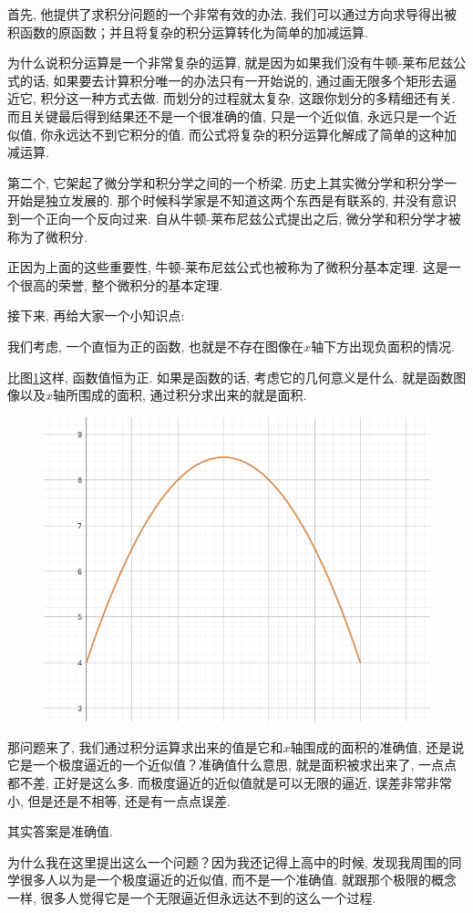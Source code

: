 首先, 他提供了求积分问题的一个非常有效的办法, 我们可以通过方向求导得出被积函数的原函数；并且将复杂的积分运算转化为简单的加减运算. 

为什么说积分运算是一个非常复杂的运算, 就是因为如果我们没有牛顿-莱布尼兹公式的话, 如果要去计算积分唯一的办法只有一开始说的, 通过画无限多个矩形去逼近它, 积分这一种方式去做. 而划分的过程就太复杂, 这跟你划分的多精细还有关. 而且关键最后得到结果还不是一个很准确的值, 只是一个近似值, 永远只是一个近似值, 你永远达不到它积分的值. 而公式将复杂的积分运算化解成了简单的这种加减运算. 

第二个, 它架起了微分学和积分学之间的一个桥梁. 历史上其实微分学和积分学一开始是独立发展的. 那个时候科学家是不知道这两个东西是有联系的, 并没有意识到一个正向一个反向过来. 自从牛顿-莱布尼兹公式提出之后, 微分学和积分学才被称为了微积分. 

正因为上面的这些重要性, 牛顿-莱布尼兹公式也被称为了微积分基本定理. 这是一个很高的荣誉, 整个微积分的基本定理. 

接下来, 再给大家一个小知识点: 

我们考虑, 一个直恒为正的函数, 也就是不存在图像在$x$轴下方出现负面积的情况. 

比图\ref{fig:img14_5}这样, 函数值恒为正. 如果是函数的话, 考虑它的几何意义是什么. 就是函数图像以及$x$轴所围成的面积, 通过积分求出来的就是面积. 

\begin{figure}[ht]
  \centering
  \includegraphics[width=0.5\linewidth]{asset/20230904153345.png}
  \caption{}
  \label{fig:img14_5}
\end{figure}

那问题来了, 我们通过积分运算求出来的值是它和$x$轴围成的面积的准确值, 还是说它是一个极度逼近的一个近似值？准确值什么意思, 就是面积被求出来了, 一点点都不差, 正好是这么多. 而极度逼近的近似值就是可以无限的逼近, 误差非常非常小, 但是还是不相等, 还是有一点点误差. 

其实答案是准确值. 

为什么我在这里提出这么一个问题？因为我还记得上高中的时候, 发现我周围的同学很多人以为是一个极度逼近的近似值, 而不是一个准确值. 就跟那个极限的概念一样, 很多人觉得它是一个无限逼近但永远达不到的这么一个过程. 

